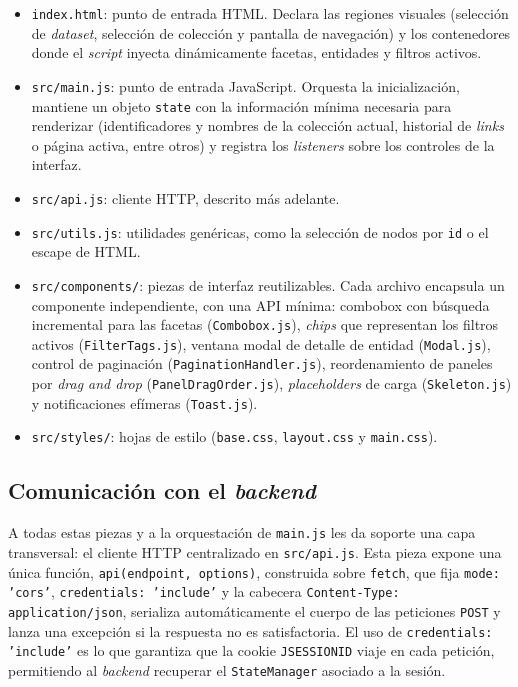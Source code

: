 \begin{itemize}
  \item \texttt{index.html}: punto de entrada HTML. Declara las
    regiones visuales (selección de \textit{dataset}, selección de
    colección y pantalla de navegación) y los contenedores donde el
    \textit{script} inyecta dinámicamente facetas, entidades y
    filtros activos.
  \item \texttt{src/main.js}: punto de entrada JavaScript. Orquesta
    la inicialización, mantiene un objeto \texttt{state} con la
    información mínima necesaria para renderizar (identificadores y
    nombres de la colección actual, historial de \textit{links} o
    página activa, entre otros) y registra los \textit{listeners}
    sobre los controles de la interfaz.
  \item \texttt{src/api.js}: cliente HTTP, descrito más adelante.
  \item \texttt{src/utils.js}: utilidades genéricas, como la
    selección de nodos por \texttt{id} o el escape de HTML.
  \item \texttt{src/components/}: piezas de interfaz reutilizables.
    Cada archivo encapsula un componente independiente, con una API
    mínima: combobox con búsqueda incremental para las facetas
    (\texttt{Combobox.js}), \textit{chips} que representan los filtros
    activos (\texttt{FilterTags.js}), ventana modal de detalle de
    entidad (\texttt{Modal.js}), control de paginación
    (\texttt{PaginationHandler.js}), reordenamiento de paneles por
    \textit{drag and drop} (\texttt{PanelDragOrder.js}),
    \textit{placeholders} de carga (\texttt{Skeleton.js}) y
    notificaciones efímeras (\texttt{Toast.js}).
  \item \texttt{src/styles/}: hojas de estilo
    (\texttt{base.css}, \texttt{layout.css} y \texttt{main.css}).
\end{itemize}

    \subsection*{Comunicación con el \textit{backend}}

A todas estas piezas y a la orquestación de \texttt{main.js} les da
soporte una capa transversal: el cliente HTTP centralizado en
\texttt{src/api.js}. Esta pieza expone una única función,
\texttt{api(endpoint, options)}, construida sobre \texttt{fetch}, que
fija \texttt{mode: \string'cors\string'}, \texttt{credentials: \string'include\string'} y la
cabecera \texttt{Content-Type: application/\-json}, serializa
automáticamente el cuerpo de las peticiones \texttt{POST} y lanza una
excepción si la respuesta no es satisfactoria. El uso de
\texttt{credentials: \string'include\string'} es lo que garantiza que la cookie
\texttt{JSESSIONID} viaje en cada petición, permitiendo al \textit{backend}
recuperar el \texttt{StateManager} asociado a la sesión.

